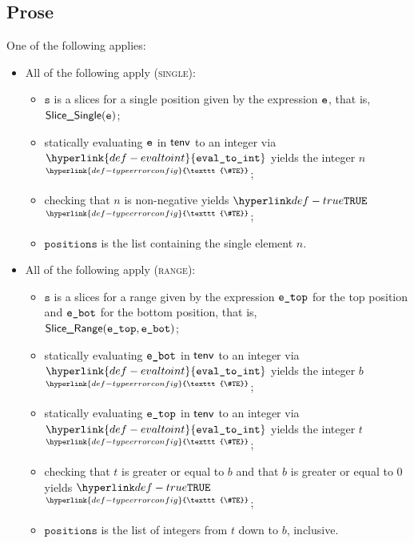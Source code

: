 \documentclass{book}
\newcommand\TypeErrorConfig[0]{\hyperlink{def-typeerrorconfig}{\texttt{\#TE}}}
\newcommand\ProseOrTypeError[0]{\hyperlink{def-proseortypeerror}{$^{\TypeErrorConfig}$}}
\newcommand\evaltoint[0]{\hyperlink{def-evaltoint}{\texttt{eval\_to\_int}}}
\newcommand\vs[0]{\texttt{s}}
\newcommand\positions[0]{\texttt{positions}}
\begin{document}
\subsection{Prose}
One of the following applies:
\begin{itemize}
  \item All of the following apply (\textsc{single}):
  \begin{itemize}
    \item $\vs$ is a slices for a single position given by the expression $\texttt{e}$, that is, \\ $\textsf{Slice\_Single}(\texttt{e})$;
    \item statically evaluating $\texttt{e}$ in $\textsf{tenv}$ to an integer via $\evaltoint$ yields the integer $n$ \ProseOrTypeError;
    \item checking that $n$ is non-negative yields $\True$ \ProseOrTypeError;
    \item $\positions$ is the list containing the single element $n$.
  \end{itemize}

  \item All of the following apply (\textsc{range}):
  \begin{itemize}
    \item $\vs$ is a slices for a range given by the expression $\texttt{e\_top}$
          for the top position and $\texttt{e\_bot}$ for the bottom position, that is, \\ $\textsf{Slice\_Range}(\texttt{e\_top}, \texttt{e\_bot})$;
    \item statically evaluating $\texttt{e\_bot}$ in $\textsf{tenv}$ to an integer via $\evaltoint$ yields the integer $b$ \ProseOrTypeError;
    \item statically evaluating $\texttt{e\_top}$ in $\textsf{tenv}$ to an integer via $\evaltoint$ yields the integer $t$ \ProseOrTypeError;
    \item checking that $t$ is greater or equal to $b$ and that $b$ is greater or equal to $0$ yields $\True$ \ProseOrTypeError;
    \item $\positions$ is the list of integers from $t$ down to $b$, inclusive.
  \end{itemize}


\end{itemize}
\end{document}
